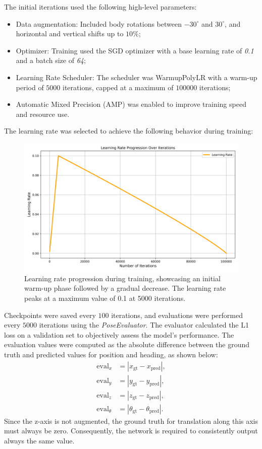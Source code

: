 The initial iterations used the following high-level parameters:
\begin{itemize}
    \item Data augmentation: Included body rotations between $-30^\circ$ and $30^\circ$, and horizontal and vertical shifts up to $10\%$;
    \item Optimizer: Training used the SGD optimizer with a base learning rate of \textit{0.1} and a batch size of \textit{64};
    \item Learning Rate Scheduler: The scheduler was WarmupPolyLR \cite{kalra2024warmuplearningrateunderlying} with a warm-up period of $5000$ iterations, capped at a maximum of $100000$ iterations;
    \item Automatic Mixed Precision (AMP) was enabled to improve training speed and resource use.
\end{itemize}

The learning rate was selected to achieve the following behavior during training:
\begin{figure}[H]
    \centering
    \includegraphics[width=0.75\linewidth]{LateX//figs/learning_rate_progression.png}
    \caption{Learning rate progression during training, showcasing an initial warm-up phase followed by a gradual decrease. The learning rate peaks at a maximum value of 0.1 at 5000 iterations.}
    \label{fig:learning-rate-progression}
\end{figure}

Checkpoints were saved every $100$ iterations, and evaluations were performed every $5000$ iterations using the \textit{PoseEvaluator}. The evaluator calculated the L1 loss on a validation set to objectively assess the model’s performance. The evaluation values were computed as the absolute difference between the ground truth and predicted values for position and heading, as shown below:
\begin{align}
    \text{eval}_x &= |x_{\text{gt}} - x_{\text{pred}}|, \\
    \text{eval}_y &= |y_{\text{gt}} - y_{\text{pred}}|, \\
    \text{eval}_z &= |z_{\text{gt}} - z_{\text{pred}}|, \\
    \text{eval}_{\theta} &= |\theta_{\text{gt}} - \theta_{\text{pred}}|.
\end{align}
Since the z-axis is not augmented, the ground truth for translation along this axis must always be zero. Consequently, the network is required to consistently output always the same value.

